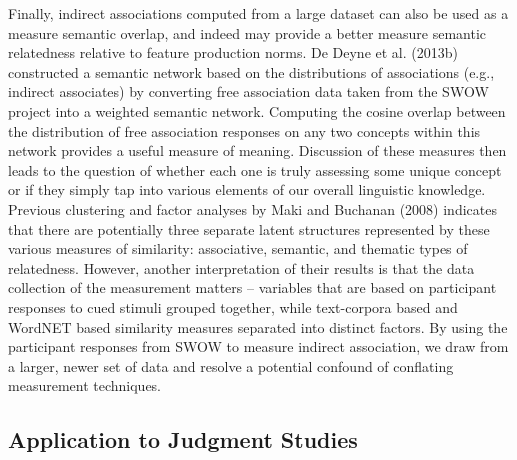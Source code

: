 \documentclass[english,,man]{apa6}
\begin{document}
Finally, indirect associations computed from a large dataset can also be used as a measure semantic overlap, and indeed may provide a better measure semantic relatedness relative to feature production norms. De Deyne et al. (2013b) constructed a semantic network based on the distributions of associations (e.g., indirect associates) by converting free association data taken from the SWOW project into a weighted semantic network. Computing the cosine overlap between the distribution of free association responses on any two concepts within this network provides a useful measure of meaning. Discussion of these measures then leads to the question of whether each one is truly assessing some unique concept or if they simply tap into various elements of our overall linguistic knowledge. Previous clustering and factor analyses by Maki and Buchanan (2008) indicates that there are potentially three separate latent structures represented by these various measures of similarity: associative, semantic, and thematic types of relatedness. However, another interpretation of their results is that the data collection of the measurement matters -- variables that are based on participant responses to cued stimuli grouped together, while text-corpora based and WordNET based similarity measures separated into distinct factors. By using the participant responses from SWOW to measure indirect association, we draw from a larger, newer set of data and resolve a potential confound of conflating measurement techniques.

\hypertarget{application-to-judgment-studies}{%
\subsection{Application to Judgment Studies}\label{application-to-judgment-studies}}
\end{document}
